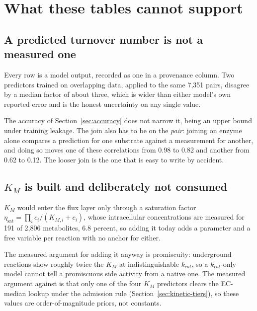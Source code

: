 
\section{What these tables cannot support}
\label{sec:limits}

\subsection{A predicted turnover number is not a measured one}

Every row is a model output, recorded as one in a provenance column. Two predictors trained
on overlapping data, applied to the same 7{,}351 pairs, disagree by a median factor of about
three, which is wider than either model's own reported error and is the honest uncertainty
on any single value.

The accuracy of Section~\ref{sec:accuracy} does not narrow it, being an upper bound under
training leakage. The join also has to be on the \emph{pair}:
joining on enzyme alone compares a prediction for one substrate against a measurement for
another, and doing so moves one of these correlations from 0.98 to 0.82 and another from
0.62 to 0.12. The looser join is the one that is easy to write by accident.

\subsection{$K_M$ is built and deliberately not consumed}

$K_M$ would enter the flux layer only through a saturation factor
$\eta_{\mathrm{sat}} = \prod_i c_i/(K_{M,i} + c_i)$, whose intracellular concentrations are
measured for 191 of 2{,}806 metabolites, 6.8 percent, so adding it today adds a parameter
and a free variable per reaction with no anchor for either.

The measured argument for adding it anyway is promiscuity: underground reactions show
roughly twice the $K_M$ at indistinguishable $k_{cat}$, so a $k_{cat}$-only model cannot
tell a promiscuous side activity from a native one. The measured argument against is that
only one of the four $K_M$ predictors clears the EC-median lookup under the admission rule
(Section~\ref{sec:kinetic-tiers}), so these values are order-of-magnitude priors, not
constants.

